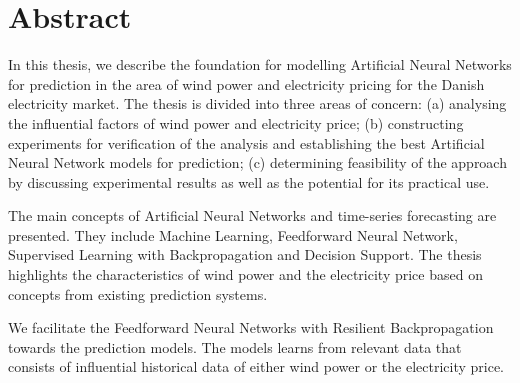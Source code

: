 \documentclass[twoside,11pt,openright]{report}
\begin{document}
	
\pagestyle{empty} 
\vspace*{\fill}
\clearpage


\pagestyle{plain}
\chapter*{Abstract}

In this thesis, we describe the foundation for modelling Artificial Neural Networks for prediction in the area of wind power and electricity pricing for the Danish electricity market. The thesis is divided into three areas of concern: (a) analysing the influential factors of wind power and electricity price; (b) constructing experiments for verification of the analysis and establishing the best Artificial Neural Network models for prediction; (c) determining feasibility of the approach by discussing experimental results as well as the potential for its practical use.

The main concepts of Artificial Neural Networks and time-series forecasting are presented. They include Machine Learning, Feedforward Neural Network, Supervised Learning with Backpropagation and Decision Support. The thesis highlights the characteristics of wind power and the electricity price based on concepts from existing prediction systems. 

We facilitate the Feedforward Neural Networks with Resilient Backpropagation towards the prediction models. The models learns from relevant data that consists of influential historical data of either wind power or the electricity price.
\end{document}
